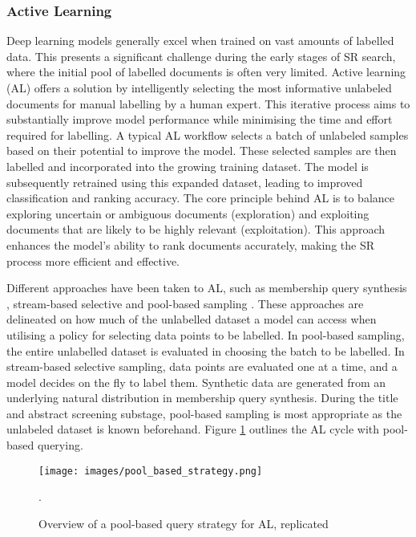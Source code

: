 \subsubsection{Active Learning}



Deep learning models generally excel when trained on vast amounts of labelled data. This presents a significant challenge during the early stages of SR search, where the initial pool of labelled documents is often very limited. Active learning (AL) offers a solution by intelligently selecting the most informative unlabeled documents for manual labelling by a human expert. This iterative process aims to substantially improve model performance while minimising the time and effort required for labelling. A typical AL workflow selects a batch of unlabeled samples based on their potential to improve the model. These selected samples are then labelled and incorporated into the growing training dataset. The model is subsequently retrained using this expanded dataset, leading to improved classification and ranking accuracy. The core principle behind AL is to balance exploring uncertain or ambiguous documents (exploration) and exploiting documents that are likely to be highly relevant (exploitation). This approach enhances the model's ability to rank documents accurately, making the SR process more efficient and effective.

Different approaches have been taken to AL, such as membership query synthesis \cite{angluin_queries_1988}, stream-based selective \cite{akinseloyin_novel_2024} and pool-based sampling \cite{lewis_sequential_1994}. These approaches are delineated on how much of the unlabelled dataset a model can access when utilising a policy for selecting data points to be labelled. In pool-based sampling, the entire unlabelled dataset is evaluated in choosing the batch to be labelled. In stream-based selective sampling, data points are evaluated one at a time, and a model decides on the fly to label them. Synthetic data are generated from an underlying natural distribution in membership query synthesis. During the title and abstract screening substage, pool-based sampling is most appropriate as the unlabeled dataset is known beforehand. Figure \ref{fig:pool_based_query} outlines the AL cycle with pool-based querying.

\begin{figure}
\centering
\texttt{[image: images/pool\_based\_strategy.png]}
\caption{Overview of a pool-based query strategy for AL, replicated\cite{ren_survey_2021}}.
\label{fig:pool_based_query}
\end{figure}





